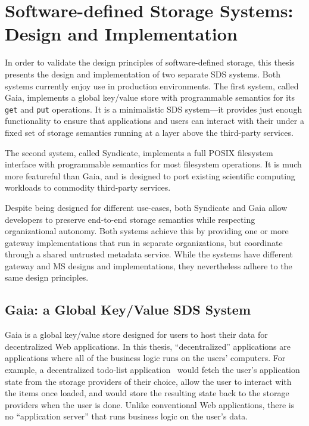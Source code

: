 \chapter{Software-defined Storage Systems: Design and Implementation}
\label{chap:syndicate_sds}

In order to validate the design principles of software-defined storage, this 
thesis presents the design and implementation of two separate SDS systems.
Both systems currently enjoy use in production environments.
The first system, called Gaia, implements a global key/value store with programmable semantics for its
\texttt{get} and \texttt{put} operations.  It is a minimalistic SDS system---it
provides just enough functionality to ensure that applications and
users can interact with their under a fixed set of storage
semantics running at a layer above the third-party services.

The second system, called Syndicate, implements
a full POSIX filesystem interface with programmable semantics for most
filesystem operations.  It is much more featureful than Gaia, and is designed
to port existing scientific computing workloads to commodity third-party
services.

Despite being designed for different use-cases, both Syndicate and Gaia allow
developers to preserve end-to-end storage semantics while respecting
organizational autonomy.  Both systems achieve this by providing one or more
gateway implementations that run in separate organizations, but
coordinate through a shared untrusted metadata service.  While the systems have
different gateway and MS designs and implementations, they nevertheless adhere to
the same design principles.

\section{Gaia: a Global Key/Value SDS System}

Gaia is a global key/value store designed for users to host their data
for decentralized Web applications.  In this thesis, ``decentralized''
applications are applications where all of the business logic runs on the
users' computers.  For example, a decentralized todo-list
application~\cite{blockstack-todo} would fetch the user's application state from
the storage providers of their choice, allow the user to interact with the items
once loaded, and would store the resulting state back to the storage providers
when the user is done.  Unlike conventional Web applications,
there is no ``application server'' that runs business logic on the user's data.


